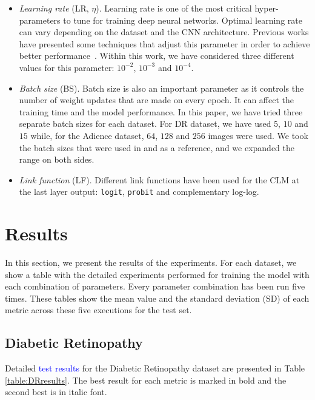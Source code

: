 \documentclass[journal]{IEEEtran}
\begin{document}
	\begin{itemize}
		\item \textit{Learning rate} (LR, $\eta$). Learning rate is one of the most critical hyper-parameters to tune for training deep neural networks. Optimal learning rate can vary depending on the dataset and the CNN architecture. Previous works have presented some techniques that adjust this parameter in order to achieve better performance~\cite{smith2017cyclical,senior2013empirical}. Within this work, we have considered three different values for this parameter: $10^{-2}$, $10^{-3}$ and $10^{-4}$.
		\item \textit{Batch size} (BS). Batch size is also an important parameter as it controls the number of weight updates that are made on every epoch. It can affect the training time and the model performance. In this paper, we have tried three separate batch sizes for each dataset. For DR dataset, we have used $5$, $10$ and $15$ while, for the Adience dataset, $64$, $128$ and $256$ images were used. We took the batch sizes that were used in \cite{de2018weighted} and \cite{beckham2017unimodal} as a reference, and we expanded the range on both sides.
		\item \textit{Link function} (LF). Different link functions have been used for the CLM at the last layer output: \texttt{logit}, \texttt{probit} and complementary log-log.
	\end{itemize}
	
	\section{Results}
	\label{sect:results}
	In this section, we present the results of the experiments. For each dataset, we show a table with the detailed experiments performed for training the model with each combination of parameters. Every parameter combination has been run five times. These tables show the mean value and the standard deviation (SD) of each metric across these five executions for the test set.
	
	\subsection{Diabetic Retinopathy}
	\label{sect:dr}
	Detailed \textcolor{blue}{test results} for the Diabetic Retinopathy dataset are presented in Table \ref{table:DRresults}. The best result for each metric is marked in bold and the second best is in italic font.
	
\end{document}
